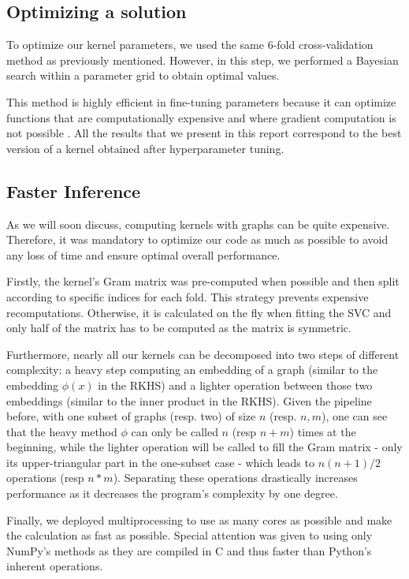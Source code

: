 \documentclass{IEEEtran}
\begin{document}
\subsection{Optimizing a solution}
To optimize our kernel parameters, we used the same 6-fold cross-validation method as previously mentioned. However, in this step, we performed a Bayesian search within a parameter grid to obtain optimal values.

This method is highly efficient in fine-tuning parameters because it can optimize functions that are computationally expensive and where gradient computation is not possible \cite{stone1976theory}.
All the results that we present in this report correspond to the best version of a kernel obtained after hyperparameter tuning.

\subsection{Faster Inference}
As we will soon discuss, computing kernels with graphs can be quite expensive. Therefore, it was mandatory to optimize our code as much as possible to avoid any loss of time and ensure optimal overall performance.

Firstly, the kernel's Gram matrix was pre-computed when possible and then split according to specific indices for each fold. This strategy prevents expensive recomputations. Otherwise, it is calculated on the fly when fitting the SVC and only half of the matrix has to be computed as the matrix is symmetric.

Furthermore, nearly all our kernels can be decomposed into two steps of different complexity:
a heavy step computing an embedding of a graph (similar to the embedding $\phi(x)$ in the RKHS)
and a lighter operation between those two embeddings (similar to the inner product in the RKHS).
Given the pipeline before, with one subset of graphs (resp. two) of size
$n$ (resp. $n,m$), one can see that the heavy method $\phi$ can only be called
$n$ (resp $n+m$) times at the beginning,
while the lighter operation will be called to fill the Gram matrix
- only its upper-triangular part in the one-subset case -
which leads to $n(n+1)/2$ operations (resp $n*m$).
Separating these operations drastically increases performance
as it decreases the program's complexity
by one degree.

Finally, we deployed multiprocessing to use as many cores as possible and make the calculation as fast as possible. Special attention was given to using only NumPy's methods as they are compiled in C and thus faster than Python's inherent operations.
\end{document}
